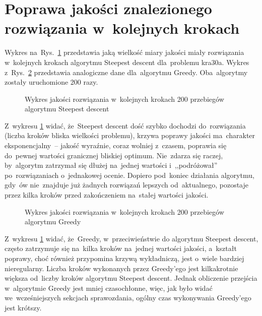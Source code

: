 \documentclass[a4paper,10pt]{article}
\begin{document}
\section{Poprawa jakości znalezionego rozwiązania w~kolejnych krokach}
Wykres na~Rys.~\ref{fig:steephistkra30a} przedstawia jaką wielkość miary jakości miały rozwiązania w~kolejnych krokach
algorytmu Steepest descent dla~problemu kra30a. Wykres z~Rys.~\ref{fig:greedyhistkra30a} przedstawia analogiczne dane
dla~algorytmu Greedy. Oba~algorytmy zostały uruchomione 200 razy.

\begin{figure}[!htpb]
\begin{center}

\caption{Wykres jakości rozwiązania w~kolejnych krokach 200 przebiegów algorytmu Steepest descent}
\label{fig:steephistkra30a}
\end{center}
\end{figure}

Z~wykresu \ref{fig:steephistkra30a} widać, że~Steepest descent dość szybko dochodzi do~rozwiązania (liczba kroków bliska wielkości problemu),
krzywa poprawy jakości ma~charakter eksponencjalny~-- jakość wyraźnie, coraz wolniej z~czasem,
poprawia się do~pewnej wartości granicznej bliskiej optimum. Nie~zdarza się raczej, by~algorytm zatrzymał się dłużej
na~jednej wartości i~,,podróżował'' po~rozwiązaniach o~jednakowej ocenie. Dopiero pod~koniec działania algorytmu, gdy~ów
nie~znajduje już żadnych rozwiązań lepszych od~aktualnego, pozostaje przez kilka kroków przed zakończeniem na~stałej
wartości jakości.

\begin{figure}[!htpb]
\begin{center}

\caption{Wykres jakości rozwiązania w~kolejnych krokach 200 przebiegów algorytmu Greedy}
\label{fig:greedyhistkra30a}
\end{center}
\end{figure}

Z~wykresu \ref{fig:steephistkra30a} widać, że~Greedy, w~przeciwieństwie do algorytmu Steepest descent, często
zatrzymuje się na~kilka kroków na~jednej wartości jakości, a~kształt poprawy, choć również przypomina krzywą wykładniczą, jest o~wiele
bardziej nieregularny. Liczba kroków wykonanych przez Greedy'ego jest kilkakrotnie większa od~liczby kroków algorytmu Steepest descent.
Jednak obliczenie przejścia w~algorytmie Greedy jest mniej czasochłonne, więc, jak było widać we~wcześniejszych sekcjach sprawozdania,
ogólny czas wykonywania Greedy'ego jest krótszy.
\end{document}
